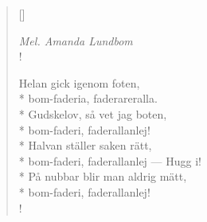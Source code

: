 
\settowidth{\versewidth}{bom-faderia, faderareralla.}



\begin{verse}[\versewidth]

\flagverse{}
\emph{Mel. Amanda Lundbom}\\!

Helan gick igenom foten,\\*
bom-faderia, faderareralla.\\*
Gudskelov, så vet jag boten,\\*
bom-faderi, faderallanlej!\\*
Halvan ställer saken rätt,\\*
bom-faderi, faderallanlej --- Hugg i!\\*
På nubbar blir man aldrig mätt,\\*
bom-faderi, faderallanlej!\\!


\end{verse}

